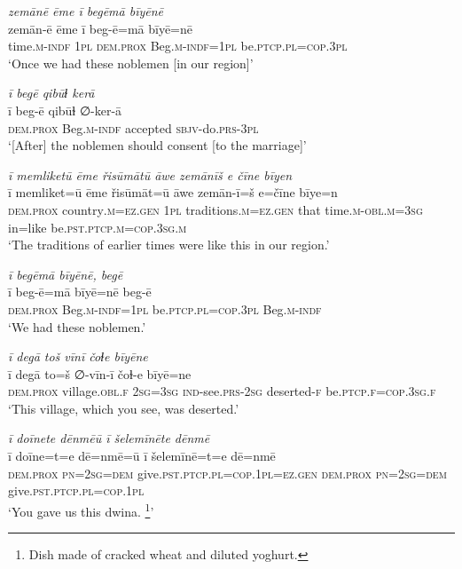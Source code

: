 \ea \label{RE.56}
\textit{zemānē ēme ī begēmā bīyēnē} \\ 
\gll zemān-ē ēme ī beg-ē=mā bīyē=nē \\ 
 time\textsc{.m}\textsc{-indf} \textsc{1pl} \textsc{dem.prox} Beg\textsc{.m}\textsc{-indf}\textsc{=\textsc{1pl}} be\textsc{.ptcp}\textsc{.pl}\textsc{=cop}\textsc{.3pl} \\ 
\glt `Once we had these noblemen [in our region]'
\z 
 
\ea \label{RE.57}
\textit{ī begē qibūɫ kerā} \\ 
\gll ī beg-ē qibūɫ ∅-ker-ā \\ 
 \textsc{dem.prox} Beg\textsc{.m}\textsc{-indf} accepted \textsc{sbjv-}do\textsc{.prs}\textsc{-3pl} \\ 
\glt `[After] the noblemen should consent [to the marriage]'
\z 
 
\ea \label{RE.62}
\textit{ī memliketū ēme řisūmātū āwe zemānīš e čīne bīyen} \\ 
\gll ī memliket=ū ēme řisūmāt=ū āwe zemān-ī=š e=čīne bīye=n \\ 
 \textsc{dem.prox} country\textsc{.m}\textsc{=ez.gen} \textsc{1pl} traditions\textsc{.m}\textsc{=ez.gen} that time\textsc{.m}\textsc{-obl}\textsc{.m}\textsc{=3sg} in=like be\textsc{.pst}\textsc{.ptcp}\textsc{.m}\textsc{=cop}\textsc{.3sg}\textsc{.m} \\ 
\glt `The traditions of earlier times were like this in our region.'
\z 
 
\ea \label{RE.63}
\textit{ī begēmā bīyēnē, begē} \\ 
\gll ī beg-ē=mā bīyē=nē beg-ē \\ 
 \textsc{dem.prox} Beg\textsc{.m}\textsc{-indf}\textsc{=\textsc{1pl}} be\textsc{.ptcp}\textsc{.pl}\textsc{=cop}\textsc{.3pl} Beg\textsc{.m}\textsc{-indf} \\ 
\glt `We had these noblemen.'
\z 
 
\ea \label{ŽE.4}
\textit{ī degā toš vīnī čoɫe bīyēne} \\ 
\gll ī degā to=š ∅-vīn-ī čoɫ-e bīyē=ne \\ 
 \textsc{dem.prox} village\textsc{.obl}\textsc{\textsc{.f}} \textsc{2sg}\textsc{=3sg} \textsc{ind-}see\textsc{.prs}-\textsc{2sg} deserted-\textsc{f} be\textsc{.ptcp}\textsc{\textsc{.f}}\textsc{=cop}\textsc{.3sg}\textsc{\textsc{.f}} \\ 
\glt `This village, which you see, was deserted.'
\z 
 
\ea \label{ŽE.50}
\textit{ī doīnete dēnmēū ī šelemīnēte dēnmē} \\ 
\gll ī doīne=t=e dē=nmē=ū ī šelemīnē=t=e dē=nmē \\ 
 \textsc{dem.prox} \textsc{pn}\textsc{=\textsc{2sg}}\textsc{=dem} give\textsc{.pst}\textsc{.ptcp}\textsc{.pl}\textsc{=cop}\textsc{.1pl}\textsc{\textsc{=ez.gen}} \textsc{dem.prox} \textsc{pn}\textsc{=\textsc{2sg}}\textsc{=dem} give\textsc{.pst}\textsc{.ptcp}\textsc{.pl}\textsc{=cop}\textsc{.1pl} \\ 
\glt `You gave us this dwina. \footnote{Dish made of cracked wheat and diluted yoghurt.}'
\z 
 
